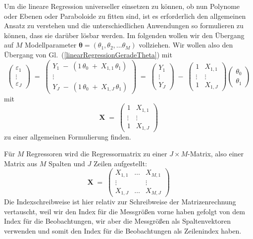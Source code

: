 Um die lineare Regression universeller einsetzen zu können, ob nun Polynome oder
Ebenen oder Paraboloide zu fitten sind, ist es erforderlich den allgemeinen Ansatz zu verstehen
und die unterschiedlichen Anwendungen so formulieren zu können, dass sie darüber lösbar werden. Im folgenden wollen wir den Übergang auf $M$ Modellparameter
$\boldsymbol{\theta} = (\theta_1, \theta_2, \ldots \theta_M)$ vollziehen.
Wir wollen also den Übergang von Gl.~(\ref{linearRegressionGeradeTheta}) mit
\begin{equation*}
\left(
\begin{array}{c}
\varepsilon_1\\
\vdots \\
\varepsilon_J
\end{array}
\right)  \; = \;
\left(
\begin{array}{c}
 Y_{1} \; - \; (1 \, \theta_0 \; + \;  X_{1,1} \, \theta_1)\\
\vdots \\
 Y_{J} \; - \; (1 \, \theta_0 \; + \;  X_{1,J} \, \theta_1)
\end{array}
\right) \; = \;
\left(
\begin{array}{c}
 Y_{1}\\
\vdots \\
 Y_{J}
\end{array}
\right)
\; - \;
\left(
\begin{array}{cc}
 1 &  X_{1,1} \\
\vdots & \vdots\\
 1 & X_{1,J}
\end{array}
\right)
\left(
\begin{array}{c}
\theta_0\\
\theta_1
\end{array}
\right)
\end{equation*}
mit
\begin{equation*}
\mathbf{X} \; = \;
\left(
\begin{array}{cc}
 1 &  X_{1,1} \\
\vdots & \vdots\\
 1 & X_{1,J}
\end{array}
\right)
\end{equation*}
zu einer allgemeinen Formulierung finden.

Für $M$ Regressoren wird die Regressormatrix zu einer $J \times M$-Matrix, also einer Matrix
aus $M$ Spalten und $J$ Zeilen aufgestellt:
\begin{equation}
\mathbf{X} \; = \;
\left(
\begin{array}{ccc}
 X_{1,1} & \dots &  X_{M,1} \\
\vdots & & \vdots \\
 X_{1,J}  & \dots &  X_{M,J}
\end{array}
\right)
\end{equation}
Die Indexschreibweise ist hier relativ zur Schreibweise der Matrizenrechnung vertauscht, weil wir den Index für die
Messgrößen vorne haben gefolgt von dem Index für die Beobachtungen, wir aber die Messgrößen als
Spaltenvektoren verwenden und somit den Index für die Beobachtungen als Zeilenindex haben.

